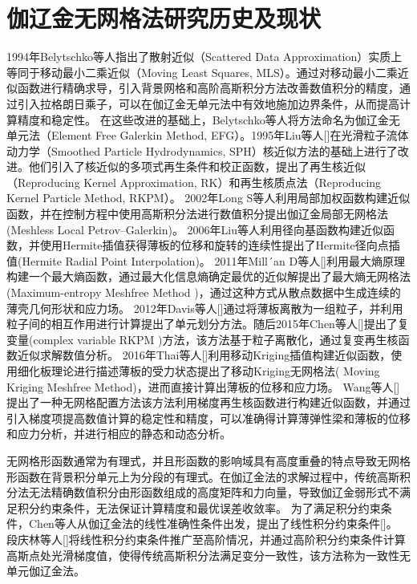 \section{伽辽金无网格法研究历史及现状}
1994年Belytschko等人\textsuperscript{\cite{belytschkoElementFreeGalerkin1994}}指出了散射近似（Scattered Data Approximation）实质上等同于移动最小二乘近似（Moving Least Squares, MLS）。通过对移动最小二乘近似函数进行精确求导，引入背景网格和高阶高斯积分方法改善数值积分的精度，通过引入拉格朗日乘子，可以在伽辽金无单元法中有效地施加边界条件，从而提高计算精度和稳定性。
在这些改进的基础上，Belytschko等人将方法命名为伽辽金无单元法（Element Free Galerkin Method, EFG）。1995年Liu等人[]在光滑粒子流体动力学（Smoothed Particle Hydrodynamics, SPH）核近似方法的基础上进行了改进。他们引入了核近似的多项式再生条件和校正函数，提出了再生核近似（Reproducing Kernel Approximation, RK）和再生核质点法（Reproducing Kernel Particle Method, RKPM）。
2002年Long S等人\cite{wuJiYuHeLinGeLaiSiNaBianFenYuanLiDeYiZhiGaoXiaoWuWangGeBenZhiBianJieTiaoJianShiJiaFangFa2022}利用局部加权函数构建近似函数，并在控制方程中使用高斯积分法进行数值积分提出伽辽金局部无网格法(Meshless Local Petrov–Galerkin)。
2006年Liu等人\cite{liuReproducingKernelParticle1995}利用径向基函数构建近似函数，并使用Hermite插值获得薄板的位移和旋转的连续性提出了Hermite径向点插值(Hermite Radial Point Interpolation)。
2011年Mill´an D等人[]利用最大熵原理构建一个最大熵函数，通过最大化信息熵确定最优的近似解提出了最大熵无网格法(Maximum-entropy Meshfree  Method )，通过这种方式从散点数据中生成连续的薄壳几何形状和应力场。
2012年Davis等人[]通过将薄板离散为一组粒子，并利用粒子间的相互作用进行计算提出了单元划分方法。随后2015年Chen等人[]提出了复变量(complex variable RKPM )方法，该方法基于粒子离散化，通过复变再生核函数近似求解数值分析。
2016年Thai等人[]利用移动Kriging插值构建近似函数，使用细化板理论进行描述薄板的受力状态提出了移动Kriging无网格法( Moving Kriging Meshfree Method)，进而直接计算出薄板的位移和应力场。
Wang等人[]提出了一种无网格配置方法该方法利用梯度再生核函数进行构建近似函数，并通过引入梯度项提高数值计算的稳定性和精度，可以准确得计算薄弹性梁和薄板的位移和应力分析，并进行相应的静态和动态分析。\par
无网格形函数通常为有理式，并且形函数的影响域具有高度重叠的特点导致无网格形函数在背景积分单元上为分段的有理式。在伽辽金法的求解过程中，传统高斯积分法无法精确数值积分由形函数组成的高度矩阵和力向量，导致伽辽金弱形式不满足积分约束条件，无法保证计算精度和最优误差收敛率。
为了满足积分约束条件，Chen等人从伽辽金法的线性准确性条件出发，提出了线性积分约束条件[]。
段庆林等人[]将线性积分约束条件推广至高阶情况，并通过高阶积分约束条件计算高斯点处光滑梯度值，使得传统高斯积分法满足变分一致性，该方法称为一致性无单元伽辽金法。
